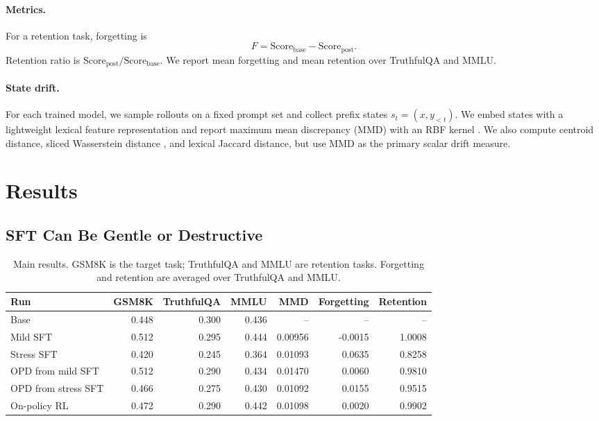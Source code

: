 \documentclass{article}
\begin{document}
\paragraph{Metrics.}
For a retention task, forgetting is
\begin{equation}
    F = \mathrm{Score}_{\mathrm{base}} - \mathrm{Score}_{\mathrm{post}}.
\end{equation}
Retention ratio is $\mathrm{Score}_{\mathrm{post}} /
\mathrm{Score}_{\mathrm{base}}$. We report mean forgetting and mean retention
over TruthfulQA and MMLU.

\paragraph{State drift.}
For each trained model, we sample rollouts on a fixed prompt set and collect
prefix states $s_t=(x,y_{<t})$. We embed states with a lightweight lexical
feature representation and report maximum mean discrepancy (MMD) with an RBF
kernel \citep{gretton2012kernel}. We also compute centroid distance, sliced
Wasserstein distance \citep{rabin2011wasserstein}, and lexical Jaccard distance,
but use MMD as the primary scalar drift measure.

\section{Results}

\subsection{SFT Can Be Gentle or Destructive}

\begin{table}[t]
\centering
\caption{Main results. GSM8K is the target task; TruthfulQA and MMLU are
retention tasks. Forgetting and retention are averaged over TruthfulQA and
MMLU.}
\label{tab:main-results}
\begin{tabular}{lrrrrrr}
\toprule
Run & GSM8K & TruthfulQA & MMLU & MMD & Forgetting & Retention \\
\midrule
Base & 0.448 & 0.300 & 0.436 & -- & -- & -- \\
Mild SFT & 0.512 & 0.295 & 0.444 & 0.00956 & -0.0015 & 1.0008 \\
Stress SFT & 0.420 & 0.245 & 0.364 & 0.01093 & 0.0635 & 0.8258 \\
OPD from mild SFT & 0.512 & 0.290 & 0.434 & 0.01470 & 0.0060 & 0.9810 \\
OPD from stress SFT & 0.466 & 0.275 & 0.430 & 0.01092 & 0.0155 & 0.9515 \\
On-policy RL & 0.472 & 0.290 & 0.442 & 0.01098 & 0.0020 & 0.9902 \\
\bottomrule
\end{tabular}
\end{table}
\end{document}

